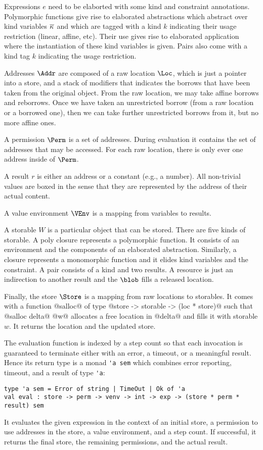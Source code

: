 Expressions $e$ need to be elaborted with some kind and constraint
annotations. Polymorphic functions give rise to elaborated
abstractions which abstract over kind variables $\overline{\kappa_{{}}}$ and
which are tagged with a kind $k$ indicating their usage restriction
(linear, affine, etc). Their use
gives rise to elaborated application where the instantiation of these
kind variables is given. Pairs also come with a kind tag $k$
indicating the usage restriction.

Addresses $\Addr$ are composed of a raw location $\Loc$, which is just
a pointer into a store, and a stack of modifiers that indicates the
borrows that have been taken from the original object. From the raw
location, we may take affine borrows and reborrows. Once we have
taken an unrestricted borrow (from a raw location or a borrowed one),
then we can take further unrestricted borrows from it, but no more
affine ones.

A permission $\Perm$ is a set of addresses. During evaluation it
contains the set of addresses that may be accessed. For each raw
location, there is only ever one address inside of $\Perm$.

A result $r$ is either an address or a constant (e.g., a number). All
non-trivial values are boxed in the sense that they are represented by
the address of their actual content.

A value environment $\VEnv$ is a mapping from variables to results. 

A storable $W$ is a particular object that can be stored. There are five
kinds of storable. A poly closure represents a polymorphic
function. It consists of an environment and the components of an
elaborated abstraction. Similarly, a closure represents a monomorphic
function and it elides kind variables and the constraint. A pair
consists of a kind and two results. A resource is just an indirection
to another result and the $\blob $ fills a released location.

Finally, the store $\Store$ is a mapping from raw locations to
storables. It comes with a function
@salloc@ of type @store -> storable -> (loc * store)@ such that
@salloc delta@ @w@ allocates a free location in @delta@ and fills it with
storable $w$. It returns the location and the updated store.


The evaluation function is indexed by a step count so that each
invocation is guaranteed to terminate either with an error, a timeout,
or a meaningful result. Hence its return type is a monad
\lstinline/'a sem/ which combines error reporting, timeout, and a
result of type \lstinline/'a/:
\begin{lstlisting}
type 'a sem = Error of string | TimeOut | Ok of 'a
val eval : store -> perm -> venv -> int -> exp -> (store * perm * result) sem
\end{lstlisting}
It evaluates the given expression in the context of an initial store, a
permission to use addresses in the store, a value environment, and a
step count. If successful, it returns the final store, the remaining
permissions, and the actual result.

